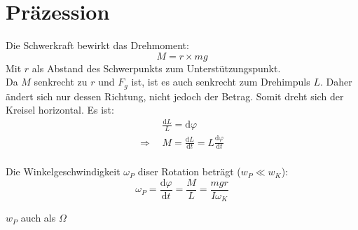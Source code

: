 \section{Präzession}
Die Schwerkraft bewirkt das Drehmoment:
\[
	M=r\times mg
\]
Mit $r$ als Abstand des Schwerpunkts zum Unterstützungspunkt.\\
\newline
Da $M$ senkrecht zu $r$ und $F_g$ ist, ist es auch senkrecht zum Drehimpuls $L$. Daher ändert sich nur dessen Richtung, nicht jedoch der Betrag. Somit dreht sich der Kreisel horizontal. Es ist:
\[
	\begin{split}
		&\frac{\mathrm{d}L}{L}=\mathrm{d}\varphi\\
		\Rightarrow\ \ &M=\frac{\mathrm{d}L}{\mathrm{d}t}=L\frac{\mathrm{d}\varphi}{\mathrm{d}t}
	\end{split}
\]\\
Die Winkelgeschwindigkeit $\omega_P$ diser Rotation beträgt ($w_P\ll w_K$):
\[
	\boxed{
		\omega_P=\frac{\mathrm{d}\varphi}{\mathrm{d}t}=\frac{M}{L}=\frac{mgr}{I\omega_K}
	}
\]
\begin{footnotesize}
	$w_P$ auch als $\Omega$\\
\end{footnotesize} 

\begin{figure}[h!]
\center
{}
\end{figure}

